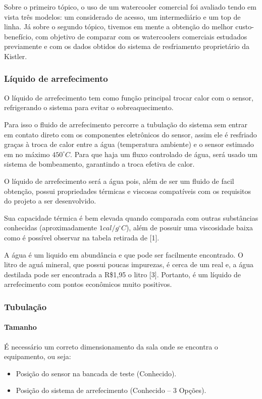 Sobre o primeiro tópico, o uso de um watercooler comercial foi avaliado tendo em vista três modelos: um considerado de acesso, um intermediário e um top de linha. Já sobre o segundo tópico, tivemos em mente a obtenção do melhor custo-benefício, com objetivo de comparar com os watercoolers comerciais estudados previamente e com os dados obtidos do sistema de resfriamento proprietário da Kistler.

\subsubsection{Líquido de arrefecimento}

O líquido de arrefecimento tem como função principal trocar calor com o sensor, refrigerando o sistema para evitar o sobreaquecimento.

Para isso o fluido de arrefecimento percorre a tubulação do sistema sem entrar em contato direto com os componentes eletrônicos do sensor, assim ele é resfriado graças à troca de calor entre a água (temperatura ambiente) e o sensor estimado em no máximo $450^{\circ}C$.  Para que haja um fluxo controlado de água, será usado um sistema de bombeamento, garantindo a troca efetiva de calor.

O líquido de arrefecimento será a água pois, além de ser um fluido de facil obtenção, possui propriedades térmicas e viscosas compatíveis com os requisitos do projeto a ser desenvolvido.

Sua capacidade térmica é bem elevada quando comparada com outras substâncias conhecidas (aproximadamente $1cal/g^{\circ}C$), além de possuir uma viscosidade baixa como é possível observar na tabela retirada de [1].

A água é um liquido em abundância e que pode ser facilmente encontrado. O litro de aguá mineral, que possui poucas impurezas, é cerca de um real e, a água destilada pode ser encontrada a R\$1,95 o litro [3]. Portanto, é um líquido de arrefecimento com pontos econômicos muito positivos.

\subsubsection{Tubulação}
\paragraph{Tamanho}
É necessário um correto dimensionamento da sala onde se encontra o equipamento, ou seja:
\begin{itemize}
\item Posição do sensor na bancada de teste (Conhecido).
\item Posição do sistema de arrefecimento (Conhecido – 3 Opções).
\end{itemize}

